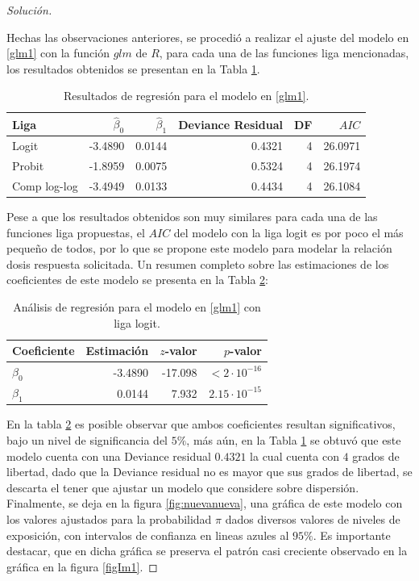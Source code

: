 \documentclass[10.5pt,notitlepage]{article}
\newenvironment{solucion}
  {\begin{proof}[Solución]}
  {\end{proof}}
\theoremstyle{plain}
\begin{document}
\begin{solucion}
\begin{enumerate}
\end{enumerate}
Hechas las observaciones anteriores, se procedió a realizar el ajuste del modelo en \eqref{glm1} con la función \(glm\) de \(R\), para cada una de las funciones liga mencionadas, los resultados obtenidos se presentan en la Tabla \ref{tablita}.
    \begin{table}[htb]
        \centering
        \begin{tabular}{@{}l@{\hskip 0.3in}r@{\hskip 0.3in}r@{\hskip 0.3in}r@{\hskip 0.3in}r@{\hskip 0.3in}r@{}}
            \toprule
            Liga & \(\hat{\beta}_0\)& \(\hat{\beta}_1\)& Deviance Residual& DF&\(AIC\) \\
            \midrule
Logit&   -3.4890& 0.0144& 0.4321& 4& 26.0971\\
Probit & -1.8959& 0.0075& 0.5324& 4& 26.1974\\
Comp log-log&  -3.4949& 0.0133& 0.4434& 4& 26.1084\\
            \bottomrule
        \end{tabular}
        \caption{Resultados de regresión para el modelo en \eqref{glm1}.}
        \label{tablita}
\end{table}
Pese a que los resultados obtenidos son muy similares para cada una de las funciones liga propuestas, el \(AIC\) del modelo con la liga logit es por poco el más pequeño de todos, por lo que se propone este modelo para modelar la relación dosis respuesta solicitada. Un resumen completo sobre las estimaciones de los coeficientes de este modelo se presenta en la Tabla \ref{tabuu}:  
\begin{table}[H]
        \centering
        \begin{tabular}{@{}l@{\hskip 0.3in}r@{\hskip 0.3in}r@{\hskip 0.3in}r@{}}
            \toprule
            Coeficiente& Estimación & \(z\)-valor& \(p\)-valor \\
            \midrule
             \(\beta_0\) &  -3.4890 &-17.098 & \(< 2\cdot10^{-16}\) \\
             \(\beta_1\) & 0.0144 & 7.932& \(2.15\cdot10^{-15}\) \\ 
            \bottomrule
        \end{tabular}
        \caption{Análisis de regresión para el modelo en \eqref{glm1} con liga logit.}
        \label{tabuu}
\end{table}
En la tabla \ref{tabuu} es posible observar que ambos coeficientes resultan significativos, bajo un nivel de significancia del \(5\%\), más aún, en la Tabla \ref{tablita} se obtuvó que este modelo cuenta con una Deviance residual \(0.4321\) la cual cuenta con \(4\) grados de libertad, dado que la Deviance residual no es mayor que sus grados de libertad, se descarta el tener que ajustar un modelo que considere sobre dispersión. Finalmente, se deja en la figura \ref{fig:nuevanueva}, una gráfica de este modelo con los valores ajustados para la probabilidad \(\pi\) dados diversos valores de niveles de exposición, con intervalos de confianza en lineas azules al \(95\%\). Es importante destacar, que en dicha gráfica se preserva el patrón casi creciente observado en la gráfica en la figura \ref{figIm1}. 

\end{solucion}
\end{document}
